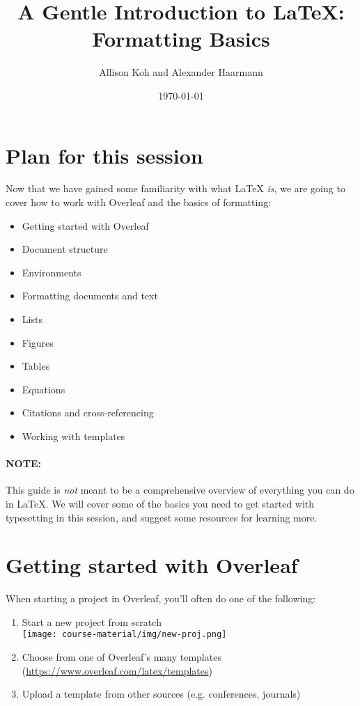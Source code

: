 \documentclass[11pt]{article}
\title{A Gentle Introduction to \LaTeX:\\Formatting Basics}
\author{Allison Koh and Alexander Haarmann}
\date{\today}
\begin{document}
\maketitle

\section*{Plan for this session}

Now that we have gained some familiarity with what {\LaTeX} \emph{is}, we are going to cover how to work with Overleaf and the basics of formatting:

\begin{itemize}[noitemsep]
    \item Getting started with Overleaf
    \item Document structure
    \item Environments
    \item Formatting documents and text
    \item Lists
    \item Figures
    \item Tables
    \item Equations
    \item Citations and cross-referencing
    \item Working with templates
\end{itemize}

\paragraph{NOTE:} This guide is \textit{not} meant to be a comprehensive overview of everything you can do in \LaTeX. We will cover some of the basics you need to get started with typesetting in this session, and suggest some resources for learning more.

\section*{Getting started with Overleaf}

When starting a project in Overleaf, you'll often do one of the following:

\begin{enumerate}
    \item Start a new project from scratch \\
        \texttt{[image: course-material/img/new-proj.png]}
    \item Choose from one of Overleaf's many templates (\href{https://www.overleaf.com/latex/templates}{https://www.overleaf.com/latex/templates})
    \item Upload a template from other sources (e.g. conferences, journals)%
\end{enumerate}
\end{document}
